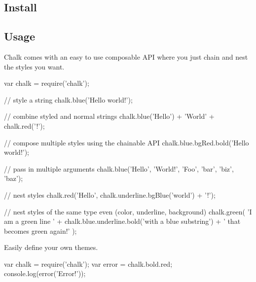 \subsection*{Install}




\subsection*{Usage}

Chalk comes with an easy to use composable A\+P\+I where you just chain and nest the styles you want.


\begin{DoxyCode}
var chalk = require(\textcolor{stringliteral}{'chalk'});

\textcolor{comment}{// style a string}
chalk.blue(\textcolor{stringliteral}{'Hello world!'});

\textcolor{comment}{// combine styled and normal strings}
chalk.blue(\textcolor{stringliteral}{'Hello'}) + \textcolor{stringliteral}{'World'} + chalk.red(\textcolor{charliteral}{'!'});

\textcolor{comment}{// compose multiple styles using the chainable API}
chalk.blue.bgRed.bold(\textcolor{stringliteral}{'Hello world!'});

\textcolor{comment}{// pass in multiple arguments}
chalk.blue(\textcolor{stringliteral}{'Hello'}, \textcolor{stringliteral}{'World!'}, \textcolor{stringliteral}{'Foo'}, \textcolor{stringliteral}{'bar'}, \textcolor{stringliteral}{'biz'}, \textcolor{stringliteral}{'baz'});

\textcolor{comment}{// nest styles}
chalk.red(\textcolor{stringliteral}{'Hello'}, chalk.underline.bgBlue(\textcolor{stringliteral}{'world'}) + \textcolor{charliteral}{'!'});

\textcolor{comment}{// nest styles of the same type even (color, underline, background)}
chalk.green(
    \textcolor{stringliteral}{'I am a green line '} +
    chalk.blue.underline.bold(\textcolor{stringliteral}{'with a blue substring'}) +
    \textcolor{stringliteral}{' that becomes green again!'}
);
\end{DoxyCode}


Easily define your own themes.


\begin{DoxyCode}
var chalk = require(\textcolor{stringliteral}{'chalk'});
var error = chalk.bold.red;
console.log(error(\textcolor{stringliteral}{'Error!'}));
\end{DoxyCode}


